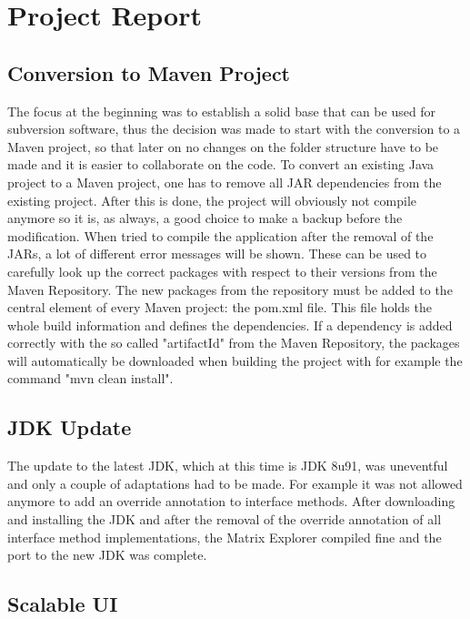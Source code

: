 \chapter{Project Report}

\section{Conversion to Maven Project}

The focus at the beginning was to establish a solid base that can be used for subversion software, thus the decision was made to start with the conversion to a Maven project, so that later on no changes on the folder structure have to be made and it is easier to collaborate on the code. To convert an existing Java project to a Maven project, one has to remove all JAR dependencies from the existing project. After this is done, the project will obviously not compile anymore so it is, as  always, a good choice to make a backup before the modification. When tried to compile the application after the removal of the JARs, a lot of different error messages will be shown. These can be used to carefully look up the correct packages with respect to their versions from the Maven Repository. The new packages from the repository must be added to the central element of every Maven project: the pom.xml file. This file holds the whole build information and defines the dependencies. If a dependency is added correctly with the so called "artifactId" from the Maven Repository, the packages will automatically be downloaded when building the project with for example the command "mvn clean install".%


\section{JDK Update}

The update to the latest JDK, which at this time is JDK 8u91, was uneventful and only a couple of adaptations had to be made. For example it was not allowed anymore to add an override annotation to interface methods. After downloading and installing the JDK and after the removal of the override annotation of all interface method implementations, the Matrix Explorer compiled fine and the port to the new JDK was complete.

\section{Scalable UI}

